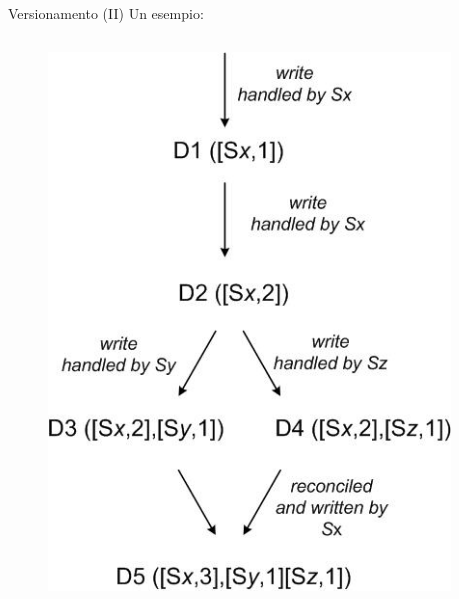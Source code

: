 \begin{frame}{Versionamento (II)}
  Un esempio:
  \begin{columns}
    \begin{column}{0.4\textwidth}
      \begin{figure}
      \centering
      \includegraphics[scale=0.4]{dynamo/versioning.png}
      \end{figure}
    \end{column}
    \begin{column}{0.5\textwidth}
      
    \end{column}
    \end{columns}  
\end{frame}


